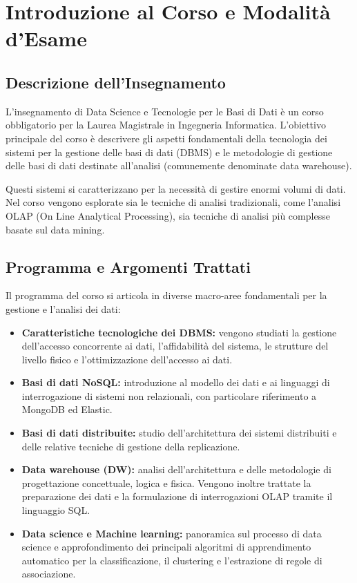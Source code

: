 \chapter*{Introduzione al Corso e Modalità d'Esame}

\section*{Descrizione dell'Insegnamento}
L'insegnamento di Data Science e Tecnologie per le Basi di Dati è un corso obbligatorio per la Laurea Magistrale in Ingegneria Informatica. L'obiettivo principale del corso è descrivere gli aspetti fondamentali della tecnologia dei sistemi per la gestione delle basi di dati (DBMS) e le metodologie di gestione delle basi di dati destinate all'analisi (comunemente denominate data warehouse). 

Questi sistemi si caratterizzano per la necessità di gestire enormi volumi di dati. Nel corso vengono esplorate sia le tecniche di analisi tradizionali, come l'analisi OLAP (On Line Analytical Processing), sia tecniche di analisi più complesse basate sul data mining.

\section*{Programma e Argomenti Trattati}
Il programma del corso si articola in diverse macro-aree fondamentali per la gestione e l'analisi dei dati:
\begin{itemize}
    \item \textbf{Caratteristiche tecnologiche dei DBMS:} vengono studiati la gestione dell'accesso concorrente ai dati, l'affidabilità del sistema, le strutture del livello fisico e l'ottimizzazione dell'accesso ai dati.
    \item \textbf{Basi di dati NoSQL:} introduzione al modello dei dati e ai linguaggi di interrogazione di sistemi non relazionali, con particolare riferimento a MongoDB ed Elastic.
    \item \textbf{Basi di dati distribuite:} studio dell'architettura dei sistemi distribuiti e delle relative tecniche di gestione della replicazione.
    \item \textbf{Data warehouse (DW):} analisi dell'architettura e delle metodologie di progettazione concettuale, logica e fisica. Vengono inoltre trattate la preparazione dei dati e la formulazione di interrogazioni OLAP tramite il linguaggio SQL.
    \item \textbf{Data science e Machine learning:} panoramica sul processo di data science e approfondimento dei principali algoritmi di apprendimento automatico per la classificazione, il clustering e l'estrazione di regole di associazione.
\end{itemize}


